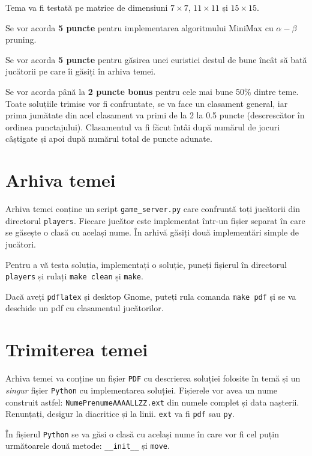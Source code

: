 \documentclass[12pt]{article}
\begin{document}
Tema va fi testată pe matrice de dimensiuni $7\times 7$, $11 \times
11$ și $15 \times 15$.

Se vor acorda \textbf{5 puncte} pentru implementarea algoritmului
MiniMax cu $\alpha-\beta$ pruning.

Se vor acorda \textbf{5 puncte} pentru găsirea unei euristici destul
de bune încât să bată jucătorii pe care îi găsiți în arhiva temei.

Se vor acorda până la \textbf{2 puncte bonus} pentru cele mai bune
50\% dintre teme. Toate soluțiile trimise vor fi confruntate, se va
face un clasament general, iar prima jumătate din acel clasament va
primi de la 2 la 0.5 puncte (descrescător în ordinea
punctajului). Clasamentul va fi făcut întâi după numărul de jocuri
câștigate și apoi după numărul total de puncte adunate.

\section{Arhiva temei}
\label{sec:arhiva}

Arhiva temei conține un script \texttt{game\_server.py} care confruntă
toți jucătorii din directorul \texttt{players}. Fiecare jucător este
implementat într-un fișier separat în care se găsește o clasă cu
același nume. În arhivă găsiți două implementări simple de jucători.

Pentru a vă testa soluția, implementați o soluție, puneți fișierul în
directorul \texttt{players} și rulați \texttt{make clean} și
\texttt{make}.

Dacă aveți \texttt{pdflatex} și desktop Gnome, puteți rula comanda
\texttt{make pdf} și se va deschide un pdf cu clasamentul jucătorilor.

\section{Trimiterea temei}
\label{sec:archive}

Arhiva temei va conține un fișier \texttt{PDF} cu descrierea soluției
folosite în temă și un \emph{singur} fișier \texttt{Python} cu
implementarea soluției. Fișierele vor avea un nume construit astfel:
\texttt{NumePrenumeAAAALLZZ.ext} din numele complet și data
nașterii. Renunțați, desigur la diacritice și la linii. \texttt{ext}
va fi \texttt{pdf} sau \texttt{py}.

În fișierul \texttt{Python} se va găsi o clasă cu același nume în care
vor fi cel puțin următoarele două metode: \texttt{\_\_init\_\_} și \texttt{move}.
\end{document}
